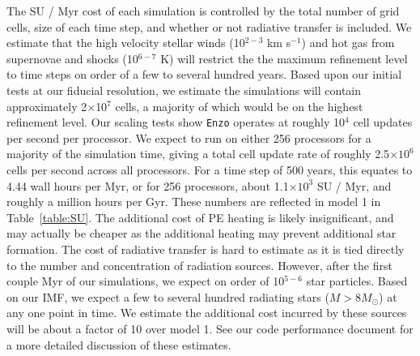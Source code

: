 \documentclass[11pt]{article}
\begin{document}
The SU / Myr cost of each simulation is controlled by the total number of grid cells, size of each time step, and whether or not radiative transfer is included. We estimate that the high velocity stellar winds (10$^{2-3}$ km s$^{-1}$) and hot gas from supernovae and shocks (10$^{6-7}$ K) will restrict the the maximum refinement level to time steps on order of a few to several hundred years. Based upon our initial tests at our fiducial resolution, we estimate the simulations will contain approximately 2$\times$10$^{7}$ cells, a majority of which would be on the highest refinement level. Our scaling tests show \texttt{Enzo} operates at roughly 10$^{4}$ cell updates per second per processor. We expect to run on either 256 processors for a majority of the simulation time, giving a total cell update rate of roughly 2.5$\times 10^{6}$ cells per second across all processors. For a time step of 500 years, this equates to 4.44 wall hours per Myr, or for 256 processors, about 1.1$\times 10^{3}$ SU / Myr, and roughly a million hours per Gyr. These numbers are reflected in model 1 in Table~\ref{table:SU}. The additional cost of PE heating is likely insignificant, and may actually be cheaper as the additional heating may prevent additional star formation. The cost of radiative transfer is hard to estimate as it is tied directly to the number and concentration of radiation sources. However, after the first couple Myr of our simulations, we expect on order of 10$^{5-6}$ star particles. Based on our IMF, we expect a few to several hundred radiating stars ($M > 8 M_{\odot}$) at any one point in time. We estimate the additional cost incurred by these sources will be about a factor of 10 over model 1. See our code performance document for a more detailed discussion of these estimates.
\end{document}

